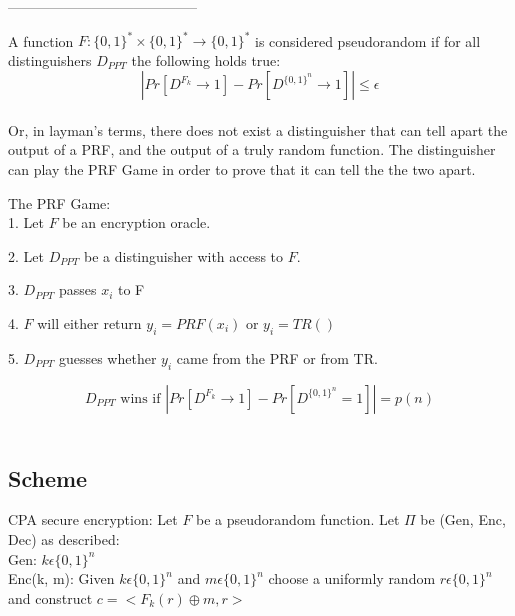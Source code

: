 \documentclass[11pt]{article}
\begin{document}
-----------------------------------------

A function $F: \{0,1\}^* \times \{0,1\}^* \rightarrow \{0,1\}^*$ is considered pseudorandom if for all distinguishers $D_{PPT}$ the following holds true:\\

$$|Pr[D^{F_k}\rightarrow 1] - Pr[D^{\{0,1\}^n}\rightarrow1]| \leq \epsilon$$\\

Or, in layman's terms, there does not exist a distinguisher that can tell apart the output of a PRF, and the output of a truly random function. The distinguisher can play the PRF Game in order to prove that it can tell the the two apart.


The PRF Game:\\

\hspace{\parindent} 1. Let $F$ be an encryption oracle.

\hspace{\parindent} 2. Let $D_{PPT}$ be a distinguisher with access to $F$.

\hspace{\parindent} 3. $D_{PPT}$ passes $x_i$ to F

\hspace{\parindent} 4. $F$ will either return $y_i = PRF(x_i)$ or $y_i = TR()$

\hspace{\parindent} 5. $D_{PPT}$ guesses whether $y_i$ came from the PRF or from TR.


$$D_{PPT} \textrm{ wins if }|Pr[D^{F_k}\rightarrow 1] - Pr[D^{\{0,1\}^n}=1]| = p(n)$$\\


\subsection*{Scheme}
CPA secure encryption: 
Let $F$ be a pseudorandom function. Let $\Pi$ be (Gen, Enc, Dec) as described:\\

\hspace{\parindent} Gen: $k \epsilon \{0,1\}^n$\\

\hspace{\parindent} Enc(k, m): Given $k \epsilon \{0,1\}^n$ and $m \epsilon \{0,1\}^n$ choose a uniformly random $r \epsilon \{0,1\}^n$ and construct $c = <F_k(r)\oplus m, r>$\\
\end{document}
